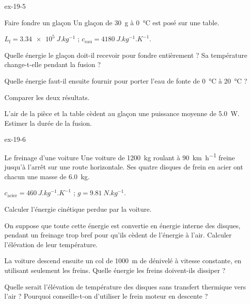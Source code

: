 \begin{blocLivre}{ex-19-5}
\begin{exercice}[1]{Faire fondre un glaçon}
Un glaçon de \qty{30}{g} à \qty{0}{\degreeCelsius} est posé sur une table.
\begin{donnees}
$L_\mathrm{f}=\qty{3,34e5}{J.kg^{-1}}$ ; $c_\mathrm{eau}=\qty{4180}{J.kg^{-1}.K^{-1}}$.
\end{donnees}
\begin{questions}
\item Quelle énergie le glaçon doit-il recevoir pour fondre entièrement ? Sa température change-t-elle pendant la
fusion ?
\item Quelle énergie faut-il ensuite fournir pour porter l'eau de fonte de \qty{0}{\degreeCelsius} à \qty{20}{\degreeCelsius} ?
\item Comparer les deux résultats.
\item L'air de la pièce et la table cèdent au glaçon une puissance moyenne de \qty{5,0}{W}. Estimer la durée de la fusion.
\end{questions}
\end{exercice}
\end{blocLivre}
\begin{blocLivre}{ex-19-6}
\begin{exercice}[2]{Le freinage d'une voiture}
Une voiture de \qty{1200}{kg} roulant à \qty{90}{km.h^{-1}} freine jusqu'à l'arrêt sur une route horizontale. Ses quatre
disques de frein en acier ont chacun une masse de \qty{6,0}{kg}.
\begin{donnees}
$c_\mathrm{acier}=\qty{460}{J.kg^{-1}.K^{-1}}$ ; $g=\qty{9,81}{N.kg^{-1}}$.
\end{donnees}
\begin{questions}
\item Calculer l'énergie cinétique perdue par la voiture.
\item On suppose que toute cette énergie est convertie en énergie interne des disques, pendant un freinage trop bref
pour qu'ils cèdent de l'énergie à l'air. Calculer l'élévation de leur température.
\item La voiture descend ensuite un col de \qty{1000}{m} de dénivelé à vitesse constante, en utilisant seulement les freins.
Quelle énergie les freins doivent-ils dissiper ?
\item Quelle serait l'élévation de température des disques sans transfert thermique vers l'air ? Pourquoi conseille-t-on
d'utiliser le frein moteur en descente ?
\end{questions}
\end{exercice}
\end{blocLivre}
